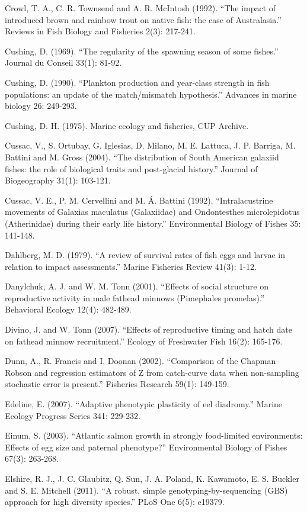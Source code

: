 \documentclass[]{book}
\begin{document}
Crowl, T. A., C. R. Townsend and A. R. McIntosh (1992). ``The impact of
introduced brown and rainbow trout on native fish: the case of
Australasia.'' Reviews in Fish Biology and Fisheries 2(3): 217-241.

Cushing, D. (1969). ``The regularity of the spawning season of some
fishes.'' Journal du Conseil 33(1): 81-92.

Cushing, D. (1990). ``Plankton production and year-class strength in
fish populations: an update of the match/mismatch hypothesis.'' Advances
in marine biology 26: 249-293.

Cushing, D. H. (1975). Marine ecology and fisheries, CUP Archive.

Cussac, V., S. Ortubay, G. Iglesias, D. Milano, M. E. Lattuca, J. P.
Barriga, M. Battini and M. Gross (2004). ``The distribution of South
American galaxiid fishes: the role of biological traits and post-glacial
history.'' Journal of Biogeography 31(1): 103-121.

Cussac, V. E., P. M. Cervellini and M. Á. Battini (1992).
``Intralacustrine movements of Galaxias maculatus (Galaxiidae) and
Ondontesthes microlepidotus (Atherinidae) during their early life
history.'' Environmental Biology of Fishes 35: 141-148.

Dahlberg, M. D. (1979). ``A review of survival rates of fish eggs and
larvae in relation to impact assessments.'' Marine Fisheries Review
41(3): 1-12.

Danylchuk, A. J. and W. M. Tonn (2001). ``Effects of social structure on
reproductive activity in male fathead minnows (Pimephales promelas).''
Behavioral Ecology 12(4): 482-489.

Divino, J. and W. Tonn (2007). ``Effects of reproductive timing and
hatch date on fathead minnow recruitment.'' Ecology of Freshwater Fish
16(2): 165-176.

Dunn, A., R. Francis and I. Doonan (2002). ``Comparison of the
Chapman--Robson and regression estimators of Z from catch-curve data
when non-sampling stochastic error is present.'' Fisheries Research
59(1): 149-159.

Edeline, E. (2007). ``Adaptive phenotypic plasticity of eel diadromy.''
Marine Ecology Progress Series 341: 229-232.

Einum, S. (2003). ``Atlantic salmon growth in strongly food-limited
environments: Effects of egg size and paternal phenotype?''
Environmental Biology of Fishes 67(3): 263-268.

Elshire, R. J., J. C. Glaubitz, Q. Sun, J. A. Poland, K. Kawamoto, E. S.
Buckler and S. E. Mitchell (2011). ``A robust, simple
genotyping-by-sequencing (GBS) approach for high diversity species.''
PLoS One 6(5): e19379.
\end{document}
